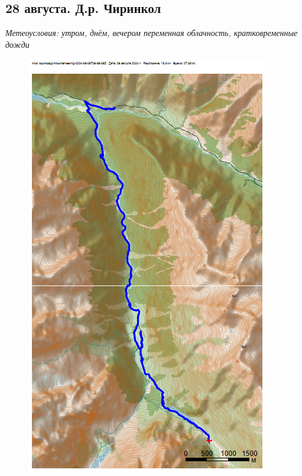 \subsection{28 августа. Д.р. Чиринкол}

\textit{Метеоусловия: утром, днём, вечером переменная облачность, кратковременные дожди}

\begin{figure}[h!]
	\centering
	\includegraphics[angle=0, width=0.7\linewidth]{../pics/mini_maps/28}
	\label{fig:mini_28}
\end{figure}

